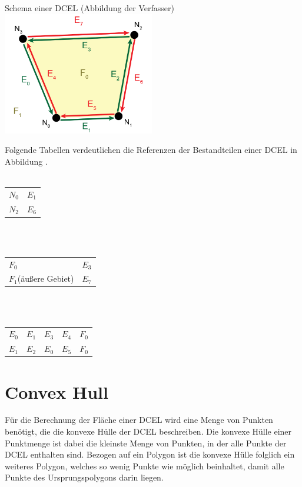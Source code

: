 \begin{Bild}{Schema einer DCEL (Abbildung der Verfasser)}
	\includegraphics[width=250px]{Bilder/DCEL-10}
\end{Bild}

Folgende Tabellen verdeutlichen die Referenzen der Bestandteilen einer DCEL in Abbildung \thebildnr.\\\\

\begin{tabularx}{\textwidth}{|Y|Y|}
	\hline
	 &  \\
	\hline
	$N_0$ & $E_1$ \\
	\hline
	$N_2$ & $E_6$ \\
	\hline
\end{tabularx}\\\\

\begin{tabularx}{\textwidth}{|Y|Y|}
	\hline
	 &  \\
	\hline
	$F_0$ & $E_3$ \\
	\hline
	$F_1$(äußere Gebiet) & $E_7$ \\
	\hline
\end{tabularx}\\\\

\begin{tabularx}{\textwidth}{|Y|Y|Y|Y|Y|}
	\hline
	 &  &  &  &  \\
	\hline
	$E_0$ & $E_1$ & $E_3$& $E_4$& $F_0$ \\
	\hline
	$E_1$ & $E_2$ & $E_0$& $E_5$& $F_0$ \\
	\hline
\end{tabularx}

\section{Convex Hull}
Für die Berechnung der Fläche einer DCEL wird eine Menge von Punkten benötigt, die die konvexe Hülle der DCEL beschreiben.
Die konvexe Hülle einer Punktmenge ist dabei die kleinste Menge von Punkten, in der alle Punkte der DCEL enthalten sind.
Bezogen auf ein Polygon ist die konvexe Hülle folglich ein weiteres Polygon, welches so wenig Punkte wie möglich beinhaltet, damit alle Punkte des Ursprungspolygons darin liegen.

